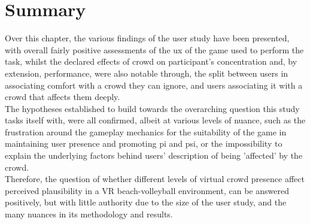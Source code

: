 \section{Summary}

Over this chapter, the various findings of the user study have been presented, with overall fairly positive assessments of the \gls{ux} of the game used to perform the task, whilst the declared effects of crowd on participant's concentration and, by extension, performance, were also notable through, the split between users in associating comfort with a crowd they can ignore, and users associating it with a crowd that affects them deeply.\\

The hypotheses established to build towards the overarching question this study tasks itself with, were all confirmed, albeit at various levels of nuance, such as the frustration around the gameplay mechanics for the suitability of the game in maintaining user presence and promoting \gls{pi} and \gls{psi}, or the impossibility to explain the underlying factors behind users' description of being 'affected' by the crowd.\\

Therefore, the question of whether different levels of virtual crowd presence affect perceived plausibility in a VR beach-volleyball environment, can be answered positively, but with little authority due to the size of the user study, and the many nuances in its methodology and results.
